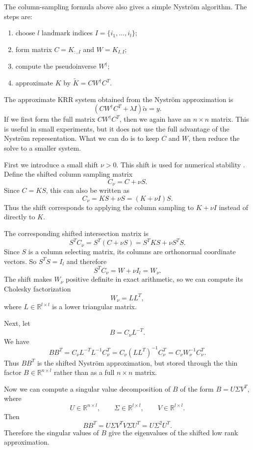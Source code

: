 The column-sampling formula above also gives a simple Nystr\"om algorithm. The steps are:
\begin{enumerate}
\item choose $l$ landmark indices $I=\{i_1,\ldots,i_l\}$;
\item form matrix $C=K_{:,I}$ and $W=K_{I,I}$;
\item compute the pseudoinverse $W^\dagger$;
\item approximate $K$ by $\tilde K=CW^\dagger C^T$.
\end{enumerate}

The approximate KRR system obtained from the Nystr\"om approximation is
\[
(CW^\dagger C^T+\lambda I)\tilde\alpha=y.
\]
If we first form the full matrix $CW^\dagger C^T$, then we again have an $n\times n$ matrix. This is useful in small experiments, but it does not use the full advantage of the Nystr\"om representation. What we can do is to keep $C$ and $W$, then reduce the solve to a smaller system.

First we introduce a small shift $\nu>0$. This shift is used for numerical
stability \citep[Algorithm~16]{martinsson2020randomized}. Define the shifted column sampling matrix 
\[
C_\nu=C+\nu S.
\]
Since $C=KS$, this can also be written as
\[
C_\nu=KS+\nu S=(K+\nu I)S.
\]
Thus the shift corresponds to applying the column sampling to $K+\nu I$ instead of directly to $K$.

The corresponding shifted intersection matrix is
\[
S^TC_\nu=S^T(C+\nu S)=S^TKS+\nu S^TS.
\]
Since $S$ is a column selecting matrix, its columns are orthonormal coordinate vectors. So
$S^TS=I_l$ and therefore
\[
S^TC_\nu=W+\nu I_l=W_\nu.
\]
The shift makes $W_\nu$ positive definite in exact arithmetic, so we can compute its
Cholesky factorization
\[
W_\nu=LL^T,
\]
where $L\in\mathbb{R}^{l\times l}$ is a lower triangular matrix.

Next, let
\[
B=C_\nu L^{-T}.
\]
We have
\[
BB^T=C_\nu L^{-T}L^{-1}C_\nu^T=C_\nu (LL^T)^{-1}C_\nu^T=C_\nu W_\nu^{-1}C_\nu^T.
\]
Thus $BB^T$ is the shifted Nystr\"om approximation, but stored through the thin factor
$B\in\mathbb{R}^{n\times l}$ rather than as a full $n\times n$ matrix.

Now we can compute a singular value decomposition of $B$ of the form $B=U\Sigma V^T$, where
\[
U\in\mathbb{R}^{n\times l},\qquad \Sigma\in\mathbb{R}^{l\times l}, \qquad V\in\mathbb{R}^{l\times l}.
\] Then
\[
BB^T=U\Sigma V^TV\Sigma U^T=U\Sigma^2U^T.
\]
Therefore the singular values of $B$ give the eigenvalues of the shifted low rank
approximation.

